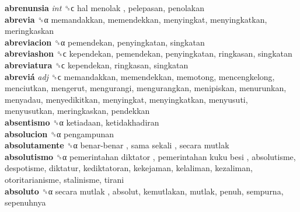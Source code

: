 \textbf{abrenunsia} \emph{int}  ␝ϲ   hal menolak , pelepasan, penolakan  \\
\textbf{abrevia} ␝α  memandakkan, memendekkan, menyingkat, menyingkatkan, meringkaskan  \\
\textbf{abreviacion} ␝α  pemendekan, penyingkatan, singkatan  \\
\textbf{abreviashon} ␝ϲ  kependekan, pemendekan, penyingkatan, ringkasan, singkatan  \\
\textbf{abreviatura} ␝ϲ  kependekan, ringkasan, singkatan  \\
\textbf{abreviá} \emph{adj}  ␝ϲ  memandakkan, memendekkan, memotong, mencengkelong, menciutkan, mengerut, mengurangi, mengurangkan, menipiskan, menurunkan, menyadau, menyedikitkan, menyingkat, menyingkatkan, menyusuti, menyusutkan, meringkaskan, pendekkan  \\
\textbf{absentismo} ␝α  ketiadaan, ketidakhadiran  \\
\textbf{absolucion} ␝α  pengampunan  \\
\textbf{absolutamente} ␝α   benar-benar ,  sama sekali ,  secara mutlak   \\
\textbf{absolutismo} ␝α   pemerintahan diktator ,  pemerintahan kuku besi , absolutisme, despotisme, diktatur, kediktatoran, kekejaman, kelaliman, kezaliman, otoritarianisme, stalinisme, tirani  \\
\textbf{absoluto} ␝α   secara mutlak , absolut, kemutlakan, mutlak, penuh, sempurna, sepenuhnya  \\
